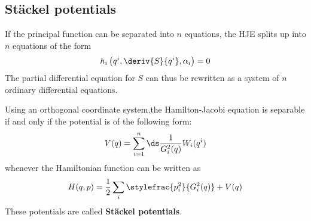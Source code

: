 \subsection{St\"ackel potentials}
	
	\begin{remark}
		If the principal function can be separated into $n$ equations, the HJE splits up into $n$ equations of the form
		\begin{gather}
			h_i\left(q^i, \deriv{S}{q^i}, \alpha_i\right) = 0
		\end{gather}
		The partial differential equation for $S$ can thus be rewritten as a system of $n$ ordinary differential equations.
	\end{remark}

	\begin{theorem}
		Using an orthogonal coordinate system,\newline the Hamilton-Jacobi equation is separable if and only if the potential is of the following form:
		\begin{gather}
			\label{lagrange:stackel_condition}
			V(q) = \sum_{i=1}^n\ds\frac{1}{G_i^2(q)}W_i(q^i)
		\end{gather}
		whenever the Hamiltonian function can be written as
		\begin{gather}
			H(q, p) = \frac{1}{2}\sum_i\stylefrac{p_i^2}{G^2_i(q)} + V(q)
		\end{gather}
		These potentials are called \textbf{St\"ackel potentials}.
	\end{theorem}
